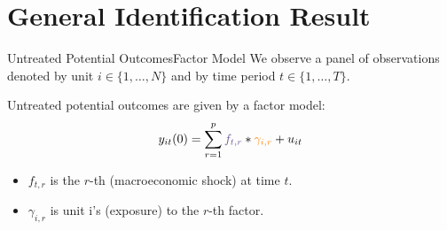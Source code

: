 \documentclass[aspectratio=43,t,11pt]{beamer}
\begin{document}
% 

% 

\section{General Identification Result}

\begin{frame}{Untreated Potential Outcomes}{Factor Model}
  We observe a panel of observations denoted by unit $i \in \{1, \dots, N\}$ and by time period $t \in \{1, \dots, T\}$. 
  
  \bigskip
  Untreated potential outcomes are given by a factor model:
  \begin{equation}\label{eq:untreated_po}
    y_{it}(0) = \sum_{r = 1}^{p} \purple{f_{t,r}} * \orange{\gamma_{i,r}} + u_{it}
  \end{equation}

  \begin{itemize}
    \item $f_{t, r}$ is the $r$-th  (macroeconomic shock) at time $t$.
    \item $\gamma_{i,r}$ is unit i's  (exposure) to the $r$-th factor.
  \end{itemize}
\end{frame}
\end{document}
